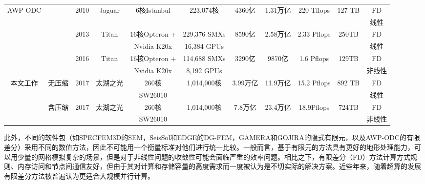 \documentclass[degree=doctor]{thuthesis}
\begin{document}
\begin{landscape}
\begin{table}[ht]
{\begin{tabular}{ccccccccccc}
\multirow{6}{*}{AWP-ODC} & \multirow{2}{*}{\citep{cui2010scalable}} & \multirow{2}{*}{2010} & \multirow{2}{*}{Jaguar} & \multirow{2}{*}{6核Istanbul} & \multirow{2}{*}{223,074核} & \multirow{2}{*}{4360亿} & \multirow{2}{*}{1.31万亿} & \multirow{2}{*}{220 Tflops} & \multirow{2}{*}{127 TB} & FD \\
 & & & & & & & & & & 线性 \\ \cline{2-11}
 & \multirow{2}{*}{\citep{cui2013physics}} & \multirow{2}{*}{2013} & \multirow{2}{*}{Titan} & 16核Opteron + & 229,376 SMXs & \multirow{2}{*}{8590亿} & \multirow{2}{*}{2.58万亿} & \multirow{2}{*}{2.33 Pflops} & \multirow{2}{*}{250TB} & FD \\
 & & & & Nvidia K20x & 16,384 GPUs & & & & & 线性 \\ \cline{2-11}
 & \multirow{2}{*}{\citep{roten2016high}} & \multirow{2}{*}{2016} & \multirow{2}{*}{Titan} & 16核Opteron + & 114,688 SMXs & \multirow{2}{*}{3290亿} & \multirow{2}{*}{9870亿} & \multirow{2}{*}{1.6 Pflops} & \multirow{2}{*}{129TB} & FD \\
 & & & & Nvidia K20x & 8,192 GPUs & & & & & 非线性 \\ \hline\hline
\multirow{4}{*}{本文工作} & \multirow{2}{*}{无压缩} & \multirow{2}{*}{2017} & \multirow{2}{*}{太湖之光} & 260核 & \multirow{2}{*}{1,014,000核} & \multirow{2}{*}{3.99万亿} & \multirow{2}{*}{11.9万亿} & \multirow{2}{*}{15.2 Pflops} & \multirow{2}{*}{892 TB} & FD \\
 & & & & SW26010 & & & & & & 线性 \\ \cline{2-11}
 & \multirow{2}{*}{含压缩} & \multirow{2}{*}{2017} & \multirow{2}{*}{太湖之光} & 260核 & \multirow{2}{*}{1,014,000核} & \multirow{2}{*}{7.8万亿} & \multirow{2}{*}{23.4万亿} & \multirow{2}{*}{18.9Pflops} & \multirow{2}{*}{724TB} & FD \\
 & & & & SW26010 & & & & & & 非线性 \\\hline\hline
\end{tabular}
}
\end{table}
\end{landscape}


此外，不同的软件包（如SPECFEM3D的SEM，SeisSol和EDGE的DG-FEM，GAMERA和GOJIRA的隐式有限元，以及AWP-ODC的有限差分）采用不同的数值方法，因此不可能用一个衡量标准对他们进行统一比较。一般而言，基于有限元的方法具有更好的地形处理能力，可以用少量的网格模拟复杂的场景，但是对于非线性问题的收敛性可能会面临严重的效率问题。相比之下，有限差分（FD）方法计算方式规则、内存访问和节点间通信友好，但由于其对计算和存储容量的高度需求而一度被认为是不切实际的解决方案。近些年来，随着超算的发展有限差分方法被普遍认为更适合大规模并行计算。
\end{document}
